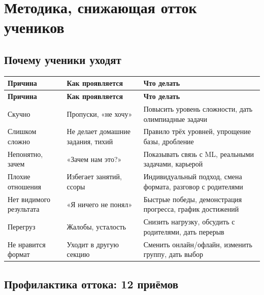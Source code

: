\documentclass[12pt,a4paper]{article}
\begin{document}
\section{Методика, снижающая отток учеников}

\subsection{Почему ученики уходят}

\begin{longtable}{L{5.2cm}L{5.4cm}L{5.4cm}}
\toprule
\textbf{Причина} & \textbf{Как проявляется} & \textbf{Что делать}\\
\midrule
\endfirsthead

\toprule
\textbf{Причина} & \textbf{Как проявляется} & \textbf{Что делать}\\
\midrule
\endhead

Скучно & Пропуски, «не хочу» & Повысить уровень сложности,
дать олимпиадные задачи\\
\addlinespace
Слишком сложно & Не делает домашние задания, тихий & Правило
трёх уровней, упрощение базы, дробление\\
\addlinespace
Непонятно, зачем & «Зачем нам это?» & Показывать связь с ML,
реальными задачами, карьерой\\
\addlinespace
Плохие отношения & Избегает занятий, ссоры & Индивидуальный подход,
смена формата, разговор с родителями\\
\addlinespace
Нет видимого результата & «Я ничего не понял» & Быстрые победы,
демонстрация прогресса, график достижений\\
\addlinespace
Перегруз & Жалобы, усталость & Снизить нагрузку, обсудить с родителями,
дать перерыв\\
\addlinespace
Не нравится формат & Уходит в другую секцию & Сменить онлайн/офлайн,
изменить группу, дать выбор\\
\bottomrule
\end{longtable}

\subsection{Профилактика оттока: 12 приёмов}
\end{document}
